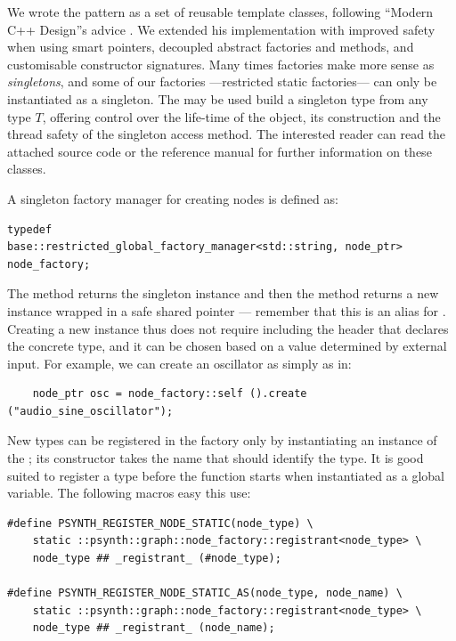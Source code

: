 We wrote the pattern as a set of reusable template classes, following
``Modern C++ Design''s advice \cite{alexandrescu01modern}. We extended
his implementation with improved safety when using smart pointers,
decoupled abstract factories and methods, and customisable constructor
signatures. Many times factories make more sense as \emph{singletons},
and some of our factories ---restricted static factories--- can only
be instantiated as a singleton.  The  may be used build
a singleton type from any type $T$, offering control over the
life-time of the object, its construction and the thread safety of the
singleton access method. The interested reader can read the attached
source code or the reference manual for further information on these
classes.

A singleton factory manager for creating nodes is defined as:
\begin{lstlisting}
typedef 
base::restricted_global_factory_manager<std::string, node_ptr>
node_factory;
\end{lstlisting}

The  method returns the singleton instance and then the
 method returns a new instance wrapped
in a safe shared pointer  --- remember that this is an
alias for . Creating a new instance thus
does not require including the header that declares the concrete type,
and it can be chosen based on a value determined by external
input. For example, we can create an oscillator as simply as in:
\begin{lstlisting}
    node_ptr osc = node_factory::self ().create ("audio_sine_oscillator");
\end{lstlisting}

New types can be registered in the factory only by instantiating an
instance of the ; its constructor
takes the name that should identify the type. It is good suited to
register a type before the  function starts when
instantiated as a global variable. The following macros easy this use:

\begin{lstlisting}
#define PSYNTH_REGISTER_NODE_STATIC(node_type) \
    static ::psynth::graph::node_factory::registrant<node_type> \
    node_type ## _registrant_ (#node_type);

#define PSYNTH_REGISTER_NODE_STATIC_AS(node_type, node_name) \
    static ::psynth::graph::node_factory::registrant<node_type> \
    node_type ## _registrant_ (node_name);
\end{lstlisting}
 
